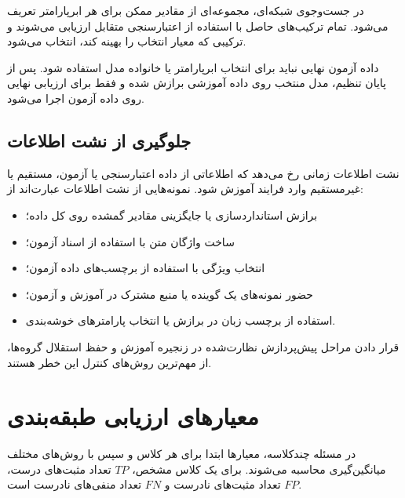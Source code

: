در جست‌وجوی شبکه‌ای، مجموعه‌ای از مقادیر ممکن برای هر ابرپارامتر تعریف می‌شود. تمام ترکیب‌های حاصل با استفاده از اعتبارسنجی متقابل ارزیابی می‌شوند و ترکیبی که معیار انتخاب را بهینه کند، انتخاب می‌شود.

داده آزمون نهایی نباید برای انتخاب ابرپارامتر یا خانواده مدل استفاده شود. پس از پایان تنظیم، مدل منتخب روی داده آموزشی برازش شده و فقط برای ارزیابی نهایی روی داده آزمون اجرا می‌شود.


\subsection{جلوگیری از نشت اطلاعات}

نشت اطلاعات زمانی رخ می‌دهد که اطلاعاتی از داده اعتبارسنجی یا آزمون، مستقیم یا غیرمستقیم وارد فرایند آموزش شود. نمونه‌هایی از نشت اطلاعات عبارت‌اند از:

\begin{itemize}

	\item برازش استانداردسازی یا جایگزینی مقادیر گمشده روی کل داده؛

	\item ساخت واژگان متن با استفاده از اسناد آزمون؛

	\item انتخاب ویژگی با استفاده از برچسب‌های داده آزمون؛

	\item حضور نمونه‌های یک گوینده یا منبع مشترک در آموزش و آزمون؛

	\item استفاده از برچسب زبان در برازش یا انتخاب پارامترهای خوشه‌بندی.

\end{itemize}

قرار دادن مراحل پیش‌پردازش نظارت‌شده در زنجیره آموزش و حفظ استقلال گروه‌ها، از مهم‌ترین روش‌های کنترل این خطر هستند.


\section{معیارهای ارزیابی طبقه‌بندی}

در مسئله چندکلاسه، معیارها ابتدا برای هر کلاس و سپس با روش‌های مختلف میانگین‌گیری محاسبه می‌شوند. برای یک کلاس مشخص، $TP$ تعداد مثبت‌های درست، $FP$ تعداد مثبت‌های نادرست و $FN$ تعداد منفی‌های نادرست است.


